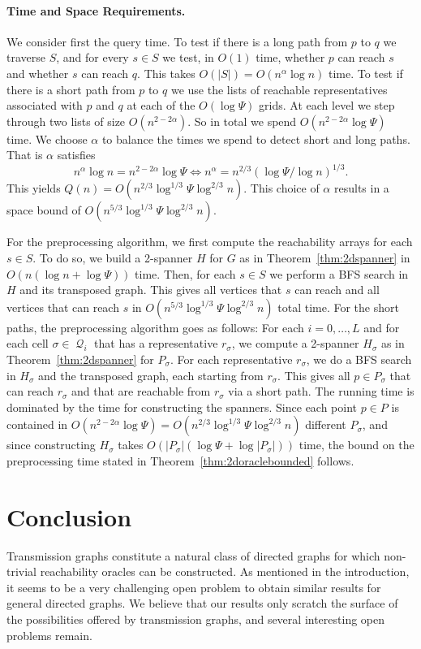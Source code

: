 \documentclass[11pt,a4paper]{paper}
\DeclareMathOperator{\Q}{\mathcal{Q}}
\begin{document}
\paragraph*{Time and Space Requirements.}
We consider first the query time. To test if there is a long path from
$p$ to $q$ we traverse $S$, and for every $s\in S$ we test,
 in $O(1)$ time, whether
$p$ can reach $s$ and whether $s$ can reach $q$.
This takes $O(|S|)= O(n^\alpha \log n)$ time.
To test if there is a short path from $p$ to $q$ we use
the lists of reachable representatives associated with $p$ and $q$ at each of the $O(\log \Psi)$ grids.
At each level
we step through two lists of size $O(n^{2-2\alpha})$. So
in total we spend $O(n^{2-2\alpha}\log\Psi)$ time.
We choose $\alpha$ to balance the times we spend to detect short and long paths.
That is $\alpha$ satisfies
\[
  n^{\alpha} \log n = n^{2-2\alpha}\log\Psi \Leftrightarrow
  n^{\alpha} = n^{2/3} (\log \Psi / \log n)^{1/3}.
\]
This yields $Q(n) = O(n^{2/3}\log^{1/3} \Psi \log^{2/3} n)$.
This choice of $\alpha$ results in a space bound of
$O(n^{5/3}\log^{1/3} \Psi \log^{2/3} n)$.

For the preprocessing algorithm, we first compute the reachability arrays
for each $s \in S$. To do so, we build a 2-spanner $H$ for $G$
as in Theorem~\ref{thm:2dspanner} in  $O(n (\log n + \log \Psi))$ time.
Then,
for each $s \in S$ we perform a BFS search in $H$ and its transposed graph.
This gives all vertices that $s$ can reach and
all vertices that can reach $s$
in $O(n^{5/3}\log^{1/3}\Psi \log^{2/3} n )$ total time.
For the short paths, the preprocessing algorithm goes as follows:
For each $i = 0,\dots, L$ and
for each cell $\sigma \in \Q_i$ that has a representative $r_\sigma$,
we compute a 2-spanner $H_\sigma$ as in Theorem~\ref{thm:2dspanner} for
$P_\sigma$.
For each representative $r_\sigma$, we do a BFS search in $H_\sigma$ and
the transposed graph, each starting from $r_\sigma$. This gives all
$p \in P_\sigma$ that can reach $r_\sigma$
and that are reachable from $r_\sigma$ via a short path.
The running time is dominated by the time for constructing the
spanners. Since each point $p \in P$ is contained in
$O(n^{2-2\alpha}\log \Psi) = O(n^{2/3} \log^{1/3}\Psi \log^{2/3} n)$
different $P_\sigma$, and
since constructing $H_\sigma$ takes
$O(|P_\sigma|(\log \Psi + \log |P_\sigma|))$
time, the bound on the  preprocessing time stated in
Theorem~\ref{thm:2doraclebounded} follows.

\section{Conclusion}
Transmission graphs constitute a natural class of
directed graphs for which non-trivial reachability
oracles can be constructed. As mentioned in the
introduction, it seems to be a very challenging
open problem to obtain similar results for general directed
graphs.  We believe that our results only scratch
the surface of the possibilities offered by transmission graphs,
and several interesting open problems remain.
\end{document}
